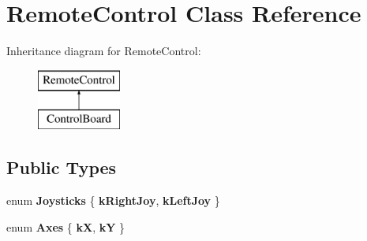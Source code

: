 \hypertarget{class_remote_control}{}\section{Remote\+Control Class Reference}
\label{class_remote_control}
Inheritance diagram for Remote\+Control\+:\begin{figure}[H]
\begin{center}
\leavevmode
\includegraphics[height=2.000000cm]{class_remote_control}
\end{center}
\end{figure}
\subsection*{Public Types}
\begin{DoxyCompactItemize}
\item 
\mbox{\label{class_remote_control_ad7f2809f8e524bd001ffd11b08ce178f}} 
enum {\bfseries Joysticks} \{ {\bfseries k\+Right\+Joy}, 
{\bfseries k\+Left\+Joy}
 \}
\item 
\mbox{\label{class_remote_control_a3442e12f9e38389adcf2cc5bf9bd5650}} 
enum {\bfseries Axes} \{ {\bfseries kX}, 
{\bfseries kY}
 \}
\end{DoxyCompactItemize}
